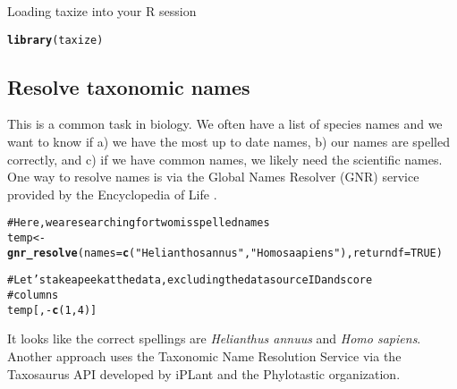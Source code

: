 \documentclass[10pt]{article}\usepackage{graphicx, color}
\makeatletter
\newcommand{\hlfunctioncall}[1]{\textcolor[rgb]{0.501960784313725,0,0.329411764705882}{\textbf{#1}}}%
\newcommand{\hlstring}[1]{\textcolor[rgb]{0.6,0.6,1}{#1}}%
\newcommand{\hlcomment}[1]{\textcolor[rgb]{0.180392156862745,0.6,0.341176470588235}{#1}}%
\newenvironment{kframe}{%
 \def\at@end@of@kframe{}%
 \ifinner\ifhmode%
  \def\at@end@of@kframe{\end{minipage}}%
  \begin{minipage}{\columnwidth}%
 \fi\fi%
 \def\FrameCommand##1{\hskip\@totalleftmargin \hskip-\fboxsep
 \colorbox{shadecolor}{##1}\hskip-\fboxsep
     \hskip-\linewidth \hskip-\@totalleftmargin \hskip\columnwidth}%
 \MakeFramed {\advance\hsize-\width
   \@totalleftmargin\z@ \linewidth\hsize
   \@setminipage}}%
 {\par\unskip\endMakeFramed%
 \at@end@of@kframe}
\newenvironment{knitrout}{}{} %
\makeatother
\begin{document}
Loading taxize into your R session

\begin{knitrout}
\color{fgcolor}\begin{kframe}
\begin{alltt}
\hlfunctioncall{library}(taxize)
\end{alltt}
\end{kframe}
\end{knitrout}


\subsection*{Resolve taxonomic names}

This is a common task in biology. We often have a list of species names and we want to know if a) we have the most up to date names, b) our names are spelled correctly, and c) if we have common names, we likely need the scientific names. One way to resolve names is via the Global Names Resolver (GNR) service provided by the Encyclopedia of Life \cite{eolgnr}.

\begin{knitrout}
\color{fgcolor}\begin{kframe}
\begin{alltt}
\hlcomment{# Here, we are searching for two misspelled names}
temp <- \hlfunctioncall{gnr_resolve}(names = \hlfunctioncall{c}(\hlstring{"Helianthos annus"}, \hlstring{"Homo saapiens"}), returndf = TRUE)

\hlcomment{# Let's take a peek at the data, excluding the data source ID and score}
\hlcomment{# columns}
temp[, -\hlfunctioncall{c}(1, 4)]
\end{alltt}
\end{kframe}
\end{knitrout}


It looks like the correct spellings are \emph{Helianthus annuus} and \emph{Homo sapiens}. Another approach uses the Taxonomic Name Resolution Service via the Taxosaurus API \cite{taxosaurus} developed by iPLant and the Phylotastic organization.
\end{document}
